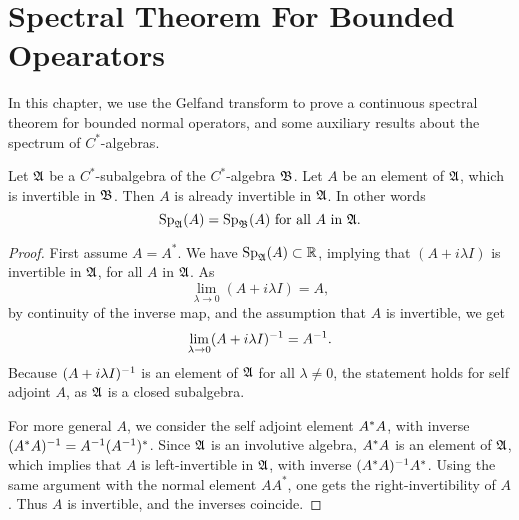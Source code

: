 
\section{Spectral Theorem For Bounded Opearators}
In this chapter, we use the Gelfand transform to prove a continuous
spectral theorem for bounded normal operators, and some auxiliary results
about the spectrum of $C^*$-algebras.
\begin{prop} \label{specinvariant}
 Let $\mathfrak{A}$ be a $C^*$-subalgebra of the $C^*$-algebra
 $\mathfrak{B}$. 
 Let $A$ be an element of $\mathfrak{A}$, which is invertible in $\mathfrak{B}$.
 Then $A$ is already invertible in $\mathfrak{A}$. In other words 
\[
   \operatorname{Sp}_{\mathfrak{A}}(A) = \operatorname{Sp}_{\mathfrak{B}}(A) \text{ for all } A \text{ in } \mathfrak{A}.
\]

\end{prop}
\begin{proof}
 First assume $A = A^* $. We have $\operatorname{Sp}_{\mathfrak{A}}(A) \subset \mathbb{R}$, implying that
  $(A + i \lambda I)$  is invertible in  $\mathfrak{A}$, for all  $A$ in $\mathfrak{A}$.
  As 
 \[
  \lim_{\lambda \to 0} (A + i \lambda I) = A,
 \]
 by continuity of the inverse map, and the assumption that $A$ is invertible,
 we get
 \[
  \lim_{\lambda \to 0} (A + i \lambda I) ^{-1} =A ^{-1}.
 \]
Because $ (A + i \lambda I)^{-1}$ is an element of $\mathfrak{A}$ for all $\lambda \neq 0$, 
the statement  holds for self adjoint $A$, as $\mathfrak{A}$ is a closed subalgebra. 

For more general $A$, we consider the self adjoint element
$A^{*} A$, with inverse  $(A^{*} A)^{-1} = A^{-1} (A^{-1})^*$. 
Since $\mathfrak{A}$ is an involutive algebra, $A^{*} A$ is an element of $\mathfrak{A}$, which implies that
$A$ is left-invertible in $\mathfrak{A}$, with inverse $(A^{*} A)^{-1} A^*$.
Using the same argument with the normal element $AA^*$, one gets the
right-invertibility of $A$. Thus $A$ is invertible, and the
inverses coincide.
\end{proof}

